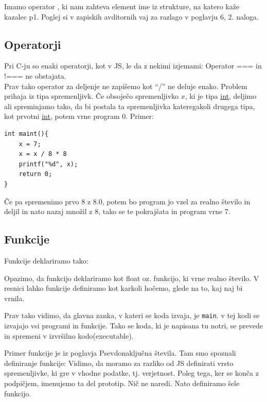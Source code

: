 \documentclass[a4paper, 12pt]{article}
\begin{document}
Imamo operator , ki nam zahteva element ime iz strukture, na katero kaže kazalec p1. Poglej si v zapiskih avditornih vaj za razlago v poglavju 6, 2. naloga.

\subsection{Operatorji}
Pri C-ju so enaki operatorji, kot v JS, le da z nekimi izjemami: Operator === in !=== ne obstajata.\\
Prav tako operator za deljenje ne zapišemo kot ``/'' ne deluje enako. Problem prihaja iz tipa spremenljivk. Če obsoječo spremenljivko $x$, ki je tipa \underline{int}, deljimo ali spreminjamo tako, da bi postala ta spremenljivka kateregakoli drugega tipa, kot prvotni \underline{int}, potem vrne program 0. Primer:
\begin{lstlisting}
int maint(){	
	x = 7;
	x = x / 8 * 8
	printf("%d", x);
	return 0;
}
\end{lstlisting}
Če pa spremenimo prvo 8 z 8.0, potem bo program jo vzel za realno število in deljil in nato nazaj množil z 8, tako se te pokrajšata in program vrne 7.

\pagebreak
\subsection{Funkcije}
Funkcije deklariramo tako:

\begin{center}
\end{center}

Opazimo, da funkcijo deklariramo kot float oz. funkcijo, ki vrne realno število. V resnici lahko funkcije definiramo kot karkoli hočemo, glede na to, kaj naj bi vrnila.

Prav tako vidimo, da glavna zanka, v kateri se koda izvaja, je \texttt{main}. v tej kodi se izvajajo vsi programi in funkcije. Tako se koda, ki je napisana tu notri, se prevede in spremeni v izvršilno kodo(executable).

Primer funkcije je iz poglavja Psevdonaključna števila. Tam smo spoznali definiranje funkcije:
 Vidimo, da moramo za razliko od JS definirati vrsto spremenljivke, ki gre v vhodne podatke, tj. verjetnost. Poleg tega, ker se konča z podpičjem, imenujemo ta del prototip. Nič ne naredi. Nato definiramo šele funkcijo.
\end{document}
